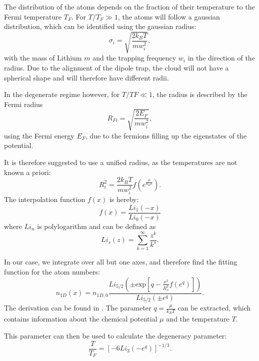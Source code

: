 The distribution of the atoms depends on the fraction of their temperature to the Fermi temperature\cite{Ketterle2008} $T_F$. For $T/T_F \gg 1$, the atoms will follow a gaussian distribution, which can be identified using the gaussian radius:
\begin{equation}
\sigma _i = \sqrt{\frac{2k_BT}{mw_i^2}},
\end{equation}
with the mass of Lithium $m$ and the trapping frequency $w_i$ in the direction of the radius. Due to the alignment of the dipole trap, the cloud will not have a spherical shape and will therefore have different radii.

In the degenerate regime however, for $T/TF \ll 1$, the radius is described by the Fermi radius
\begin{equation}
R_{Fi} = \sqrt{\frac{2E_F}{mw_i^2}},
\end{equation}
using the Fermi energy $E_F$, due to the fermions filling up the eigenstates of the potential.

It is therefore suggested\cite{Ketterle2008} to use a unified radius, as the temperatures are not known a priori:
\begin{equation}
R_i^2 = \frac{2k_BT}{mw_i^2}f( e^{\frac{\mu}{k_BT}}).
\end{equation}
The interpolation function $f(x)$ is hereby:
\begin{equation}
f(x) = \frac{Li_1(-x)}{Li_0(-x)}
\end{equation}
where $Li_n$ is polylogarithm and can be defined as
\begin{equation}
Li_s(z) = \sum_{k=1}^{\infty} \frac{z^k}{k^s}.
\end{equation}

In our case, we integrate over all but one axes, and therefore find the fitting function for the atom numbers:
\begin{equation}
\label{eq:n1d}
n_{1D}(x) = n_{1D,0}\frac{Li_{5/2}\left( \pm \mathrm{exp}\left[ q-\frac{x^2}{R_x^2}f(e^q)\right] \right)}{Li_{5/2}(\pm e^q)}.
\end{equation}
The derivation can be found in \cite{Ketterle2008}. The parameter $q=\frac{\mu}{k_BT}$ can be extracted, which contains information about the chemical potential $\mu$ and the temperature $T$.

This parameter can then be used to calculate the degeneracy parameter:
\begin{equation}
\frac{T}{T_F} = \left[ -6 Li_3(-e^q) \right]^{-1/3}.
\end{equation}

